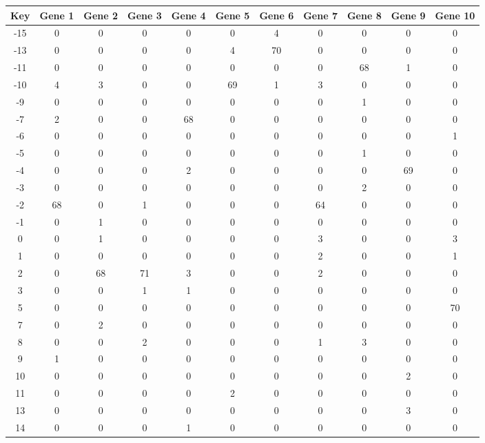 \begin{tabular}{|c|c|c|c|c|c|c|c|c|c|c|}
\hline
Key & Gene 1 & Gene 2 & Gene 3 & Gene 4 & Gene 5 & Gene 6 & Gene 7 & Gene 8 & Gene 9 & Gene 10 \\
\hline
-15 & 0 & 0 & 0 & 0 & 0 & 4 & 0 & 0 & 0 & 0 \\
-13 & 0 & 0 & 0 & 0 & 4 & 70 & 0 & 0 & 0 & 0 \\
-11 & 0 & 0 & 0 & 0 & 0 & 0 & 0 & 68 & 1 & 0 \\
-10 & 4 & 3 & 0 & 0 & 69 & 1 & 3 & 0 & 0 & 0 \\
-9 & 0 & 0 & 0 & 0 & 0 & 0 & 0 & 1 & 0 & 0 \\
-7 & 2 & 0 & 0 & 68 & 0 & 0 & 0 & 0 & 0 & 0 \\
-6 & 0 & 0 & 0 & 0 & 0 & 0 & 0 & 0 & 0 & 1 \\
-5 & 0 & 0 & 0 & 0 & 0 & 0 & 0 & 1 & 0 & 0 \\
-4 & 0 & 0 & 0 & 2 & 0 & 0 & 0 & 0 & 69 & 0 \\
-3 & 0 & 0 & 0 & 0 & 0 & 0 & 0 & 2 & 0 & 0 \\
-2 & 68 & 0 & 1 & 0 & 0 & 0 & 64 & 0 & 0 & 0 \\
-1 & 0 & 1 & 0 & 0 & 0 & 0 & 0 & 0 & 0 & 0 \\
0 & 0 & 1 & 0 & 0 & 0 & 0 & 3 & 0 & 0 & 3 \\
1 & 0 & 0 & 0 & 0 & 0 & 0 & 2 & 0 & 0 & 1 \\
2 & 0 & 68 & 71 & 3 & 0 & 0 & 2 & 0 & 0 & 0 \\
3 & 0 & 0 & 1 & 1 & 0 & 0 & 0 & 0 & 0 & 0 \\
5 & 0 & 0 & 0 & 0 & 0 & 0 & 0 & 0 & 0 & 70 \\
7 & 0 & 2 & 0 & 0 & 0 & 0 & 0 & 0 & 0 & 0 \\
8 & 0 & 0 & 2 & 0 & 0 & 0 & 1 & 3 & 0 & 0 \\
9 & 1 & 0 & 0 & 0 & 0 & 0 & 0 & 0 & 0 & 0 \\
10 & 0 & 0 & 0 & 0 & 0 & 0 & 0 & 0 & 2 & 0 \\
11 & 0 & 0 & 0 & 0 & 2 & 0 & 0 & 0 & 0 & 0 \\
13 & 0 & 0 & 0 & 0 & 0 & 0 & 0 & 0 & 3 & 0 \\
14 & 0 & 0 & 0 & 1 & 0 & 0 & 0 & 0 & 0 & 0 \\
\hline
\end{tabular}